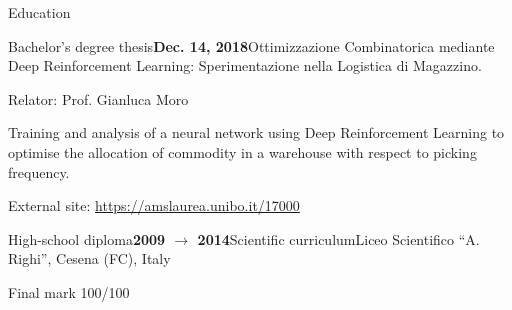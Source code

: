 \documentclass{resume} %
\begin{document}
\begin{rSection}{Education}
        \begin{rSubsection}{Bachelor's degree thesis}{\textbf{Dec. 14, 2018}}{Ottimizzazione Combinatorica mediante Deep Reinforcement Learning: Sperimentazione nella Logistica di Magazzino.}{\begin{flushright}
                    Relator: Prof. Gianluca Moro
            \end{flushright}}
            \item Training and analysis of a neural network using Deep Reinforcement Learning to optimise the allocation of commodity in a warehouse with respect to picking frequency.
            
            \item External site: \url{https://amslaurea.unibo.it/17000}
        \end{rSubsection}
        
        \begin{rSubsection}{High-school diploma}{\textbf{2009 $\rightarrow$ 2014}}{Scientific curriculum}{Liceo Scientifico ``A. Righi'', Cesena (FC), Italy}
            \item Final mark 100/100
        \end{rSubsection}
        
    \end{rSection}
    
    
\end{document}
